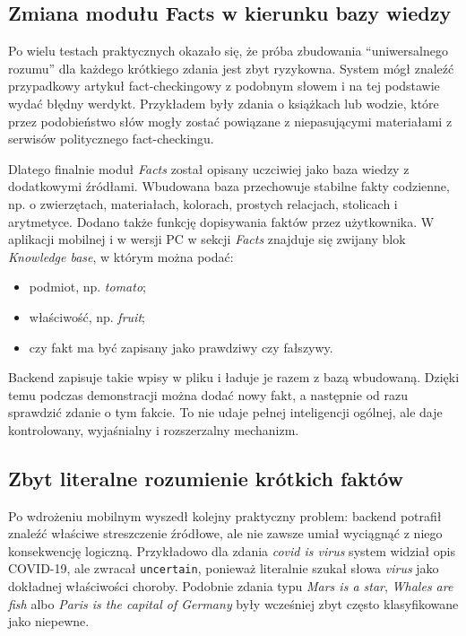 \documentclass[12pt,a4paper]{article}
\begin{document}
\subsection{Zmiana modułu Facts w kierunku bazy wiedzy}
Po wielu testach praktycznych okazało się, że próba zbudowania ``uniwersalnego rozumu'' dla każdego krótkiego zdania jest zbyt ryzykowna.
System mógł znaleźć przypadkowy artykuł fact-checkingowy z podobnym słowem i na tej podstawie wydać błędny werdykt.
Przykładem były zdania o książkach lub wodzie, które przez podobieństwo słów mogły zostać powiązane z niepasującymi materiałami z serwisów politycznego fact-checkingu.

Dlatego finalnie moduł \textit{Facts} został opisany uczciwiej jako baza wiedzy z dodatkowymi źródłami.
Wbudowana baza przechowuje stabilne fakty codzienne, np. o zwierzętach, materiałach, kolorach, prostych relacjach, stolicach i arytmetyce.
Dodano także funkcję dopisywania faktów przez użytkownika.
W aplikacji mobilnej i w wersji PC w sekcji \textit{Facts} znajduje się zwijany blok \textit{Knowledge base}, w którym można podać:
\begin{itemize}
  \item podmiot, np. \textit{tomato};
  \item właściwość, np. \textit{fruit};
  \item czy fakt ma być zapisany jako prawdziwy czy fałszywy.
\end{itemize}

Backend zapisuje takie wpisy w pliku  i ładuje je razem z bazą wbudowaną.
Dzięki temu podczas demonstracji można dodać nowy fakt, a następnie od razu sprawdzić zdanie o tym fakcie.
To nie udaje pełnej inteligencji ogólnej, ale daje kontrolowany, wyjaśnialny i rozszerzalny mechanizm.

\subsection{Zbyt literalne rozumienie krótkich faktów}
Po wdrożeniu mobilnym wyszedł kolejny praktyczny problem: backend potrafił znaleźć właściwe streszczenie źródłowe, ale nie zawsze umiał wyciągnąć z niego konsekwencję logiczną.
Przykładowo dla zdania \textit{covid is virus} system widział opis COVID-19, ale zwracał \texttt{uncertain}, ponieważ literalnie szukał słowa \textit{virus} jako dokładnej właściwości choroby.
Podobnie zdania typu \textit{Mars is a star}, \textit{Whales are fish} albo \textit{Paris is the capital of Germany} były wcześniej zbyt często klasyfikowane jako niepewne.
\end{document}
